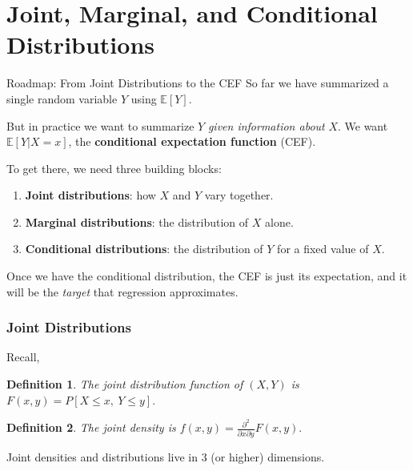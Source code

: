 \documentclass[aspectratio=169, handout, t]{beamer}
\newtheorem{defn}{Definition}
\numberwithin{equation}{section}
\begin{document}
\section[CEF]{Joint, Marginal, and Conditional Distributions}

\begin{frame}{Roadmap: From Joint Distributions to the CEF}
So far we have summarized a single random variable $Y$ using $\mathbb{E}[Y]$.\pause

\vspace{0.3cm}

But in practice we want to summarize $Y$ \emph{given information about} $X$. We want $\mathbb{E}[Y|X=x]$, the \textbf{conditional expectation function} (CEF).\pause

\vspace{0.3cm}

To get there, we need three building blocks:
\begin{enumerate}
\item \textbf{Joint distributions}: how $X$ and $Y$ vary together.
\item \textbf{Marginal distributions}: the distribution of $X$ alone.
\item \textbf{Conditional distributions}: the distribution of $Y$ for a fixed value of $X$.
\end{enumerate}\pause

\vspace{0.3cm}

Once we have the conditional distribution, the CEF is just its expectation, and it will be the \emph{target} that regression approximates.
\end{frame}


\begin{frame}
\frametitle{Joint Distributions}
Recall,
\begin{defn}
The joint distribution function of $(X,Y)$ is $F(x,y)=P[X\leq x,\ Y\leq y].$
\end{defn}
\begin{defn}
The joint density is
$f(x,y)=\frac{\partial^2}{\partial x \partial y} F(x,y).$
\end{defn}\pause
\bigskip
Joint densities and distributions live in 3 (or higher) dimensions.
\end{frame}
\end{document}
